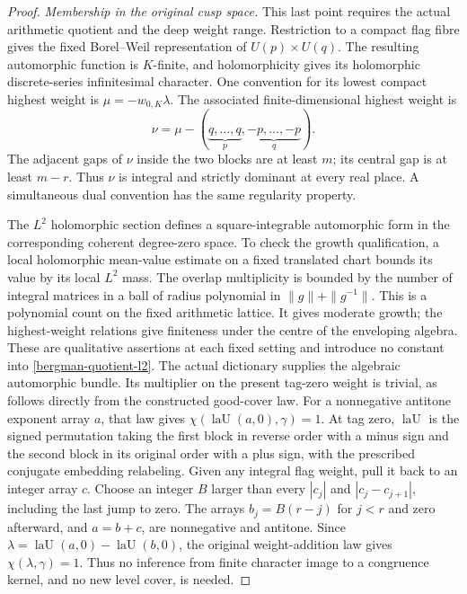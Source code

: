\begin{proof}
\emph{Membership in the original cusp space.}
This last point requires the actual arithmetic quotient and the deep
weight range.  Restriction to a compact flag fibre gives the fixed
Borel--Weil representation of $U(p)\times U(q)$.
The resulting automorphic function is $K$-finite, and holomorphicity
gives its holomorphic discrete-series infinitesimal character.
One convention for its lowest compact highest weight is
$\mu=-w_{0,K}\lambda$.
The associated finite-dimensional highest weight is
\[
 \nu=\mu-(\underbrace{q,\ldots,q}_{p},
                   \underbrace{-p,\ldots,-p}_{q}).
\]
The adjacent gaps of $\nu$ inside the two blocks are at least $m$;
its central gap is at least $m-r$.  Thus $\nu$ is integral and strictly
dominant at every real place.  A simultaneous dual convention has the
same regularity property.

The $L^2$ holomorphic section defines a square-integrable automorphic
form in the corresponding coherent degree-zero space.
To check the growth qualification, a local holomorphic mean-value
estimate on a fixed translated chart bounds its value by its local
$L^2$ mass.  The overlap multiplicity is bounded by the number of
integral matrices in a ball of radius polynomial in
$\|g\|+\|g^{-1}\|$.  This is a polynomial count on the fixed
arithmetic lattice.  It gives moderate growth; the highest-weight
relations give finiteness under the centre of the enveloping algebra.
These are qualitative assertions at each fixed setting and introduce
no constant into \eqref{bergman-quotient-l2}.
The actual dictionary supplies the algebraic automorphic bundle.
Its multiplier on the present tag-zero weight is trivial, as follows
directly from the constructed good-cover law.  For a nonnegative
antitone exponent array $a$, that law gives
$\chi(\operatorname{laU}(a,0),\gamma)=1$.
At tag zero, $\operatorname{laU}$ is the signed permutation taking
the first block in reverse order with a minus sign and the second
block in its original order with a plus sign, with the prescribed
conjugate embedding relabeling.  Given any integral flag weight,
pull it back to an integer array $c$.  Choose an integer $B$ larger
than every $|c_j|$ and $|c_j-c_{j+1}|$, including the last jump to
zero.  The arrays $b_j=B(r-j)$ for $j<r$ and zero afterward, and
$a=b+c$, are nonnegative and antitone.  Since
$\lambda=\operatorname{laU}(a,0)-\operatorname{laU}(b,0)$,
the original weight-addition law gives $\chi(\lambda,\gamma)=1$.
Thus no inference from finite character image to a congruence kernel,
and no new level cover, is needed.


\end{proof}
